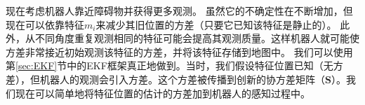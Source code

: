
现在考虑机器人靠近障碍物并获得更多观测。 虽然它的不确定性在不断增加，但现在可以依靠特征$ m_i $来减少其旧位置的方差（只要它已知该特征是静止的）。 此外，从不同角度重复观测相同的特征可能会提高其观测质量。这样机器人就可能使方差非常接近初始观测该特征的方差，并将该特征存储到地图中。 我们可以使用第\ref{sec:EKF}节中的EKF框架真正地做到。当时，我们假设特征位置已知（无方差），但机器人的观测会引入方差。这个方差被传播到创新的协方差矩阵（$\boldsymbol{S}$）。我们现在可以简单地将特征位置的估计的方差加到机器人的感知过程中。


